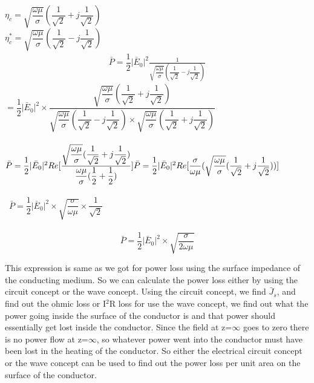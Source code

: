 $\eta_{c}=\sqrt{\dfrac{\omega\mu}{\sigma}}(\dfrac{1}{\sqrt{2}}+j\dfrac{1}{\sqrt{2}})$\\
$\eta_{c}^{\ast}=\sqrt{\dfrac{\omega\mu}{\sigma}}(\dfrac{1}{\sqrt{2}}-j\dfrac{1}{\sqrt{2}})$\\
\begin{align}
\bar{P}=\dfrac{1}{2}\lvert\bar{E}_{0}\rvert^{2}{\frac{1}{\sqrt{\dfrac{\omega\mu}{\sigma}}(\dfrac{1}{\sqrt{2}}-j\dfrac{1}{\sqrt{2}})}} 
\end{align}
$=\dfrac{1}{2}\lvert\bar{E}_{0}\rvert^{2}\times \dfrac{\sqrt{\dfrac{\omega\mu}{\sigma}}(\dfrac{1}{\sqrt{2}}+j\dfrac{1}{\sqrt{2}})}{\sqrt{\dfrac{\omega\mu}{\sigma}}(\dfrac{1}{\sqrt{2}}-j\dfrac{1}{\sqrt{2}})\times \sqrt{\dfrac{\omega\mu}{\sigma}}(\dfrac{1}{\sqrt{2}}+j\dfrac{1}{\sqrt{2}})}$\\\\
$\bar{P}=\dfrac{1}{2}\lvert\bar{E}_{0}\rvert^{2}Re[\dfrac{\sqrt{\dfrac{\omega\mu}{\sigma}}(\dfrac{1}{\sqrt{2}}+j\dfrac{1}{\sqrt{2}})}{\dfrac{\omega\mu}{\sigma}(\dfrac{1}{2}+\dfrac{1}{2})}]\\\\
\bar{P}=\dfrac{1}{2}\lvert\bar{E}_{0}\rvert^{2}Re[\dfrac{\sigma}{\omega\mu}(\sqrt{\dfrac{\omega\mu}{\sigma}}(\dfrac{1}{\sqrt{2}}+j\dfrac{1}{\sqrt{2}}))]$\\\\\
$\bar{P}=\dfrac{1}{2}\lvert\bar{E}_{0}\rvert^{2}\times \sqrt{\dfrac{\sigma}{\omega\mu}}\times \dfrac{1}{\sqrt{2}}$\\\\
\begin{equation}
\bar{P}=\dfrac{1}{2}\lvert\bar{E}_{0}\rvert^{2}\times \sqrt{\dfrac{\sigma}{2\omega\mu}}
\end{equation}

This expression is same as we got for power loss using the surface impedance of the conducting medium. So we can calculate the power loss either by using the circuit concept or the wave concept. Using the circuit concept, we find $\bar{J}$$_{s}$, and find out the ohmic loss or I$^{2}$R loss for use the wave concept, we find out what the power going inside the surface of the conductor is and that power should essentially get lost inside the conductor. Since the field at z=$\infty$ goes to zero there is no power flow at z=$\infty$, so whatever power went into the conductor must have been lost in the heating of the conductor. So either the electrical circuit concept or the wave concept can be used to find out the power loss per unit area on the surface of the conductor.

